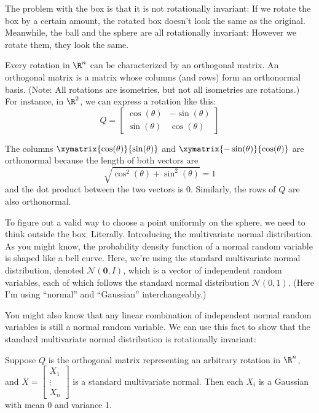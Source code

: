 \documentclass{article}
\begin{document}
The problem with the box is that it is not rotationally invariant: If we rotate the box by a certain amount, the rotated box doesn't look the same as the original. Meanwhile, the ball and the sphere are all rotationally invariant: However we rotate them, they look the same.

Every rotation in $\R^n$ can be characterized by an orthogonal matrix. An orthogonal matrix is a matrix whose columns (and rows) form an orthonormal basis. (Note: All rotations are isometries, but not all isometries are rotations.) For instance, in $\R^2$, we can express a rotation like this:
\[
    Q = \begin{bmatrix}
        \cos(\theta) & -\sin(\theta) \\
        \sin(\theta) & \cos(\theta)
    \end{bmatrix}
\]

The columns $\xymatrix{\cos(\theta)}{\sin(\theta)}$ and $\xymatrix{-\sin(\theta)}{\cos(\theta)}$ are orthonormal because the length of both vectors are
\[
    \sqrt{\cos^2(\theta) + \sin^2(\theta)} = 1
\]
and the dot product between the two vectors is 0. Similarly, the rows of $Q$ are also orthonormal.


To figure out a valid way to choose a point uniformly on the sphere, we need to think outside the box. Literally. Introducing the multivariate normal distribution. As you might know, the probability density function of a normal random variable is shaped like a bell curve. Here, we're using the standard multivariate normal distribution, denoted $\mathcal{N}(\mathbf{0}, I)$, which is a vector of independent random variables, each of which follows the standard normal distribution $\mathcal{N}(0, 1)$. (Here I'm using ``normal'' and ``Gaussian'' interchangeably.)

You might also know that any linear combination of independent normal random variables is still a normal random variable. We can use this fact to show that the standard multivariate normal distribution is rotationally invariant:

Suppose $Q$ is the orthogonal matrix representing an arbitrary rotation in $\R^n$, and
$X = \begin{bmatrix}
        X_1 \\ \vdots \\ X_n
    \end{bmatrix}$ is a standard multivariate normal. Then each $X_i$ is a Gaussian with mean 0 and variance 1.
\end{document}
